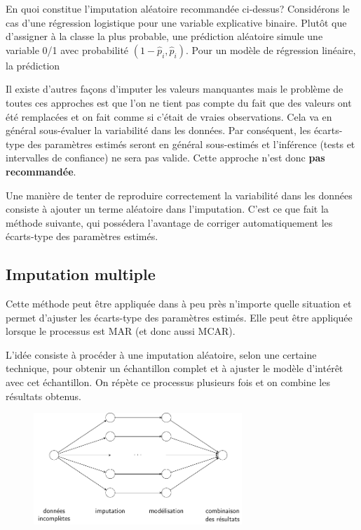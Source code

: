 \documentclass[
  11pt,
  letterpaper,
]{scrbook}
\theoremstyle{definition}
\theoremstyle{remark}
\begin{document}
En quoi constitue l'imputation aléatoire recommandée ci-dessus?
Considérons le cas d'une régression logistique pour une variable
explicative binaire. Plutôt que d'assigner à la classe la plus probable,
une prédiction aléatoire simule une variable 0/1 avec probabilité
\((1-\widehat{p}_i, \widehat{p}_i)\). Pour un modèle de régression
linéaire, la prédiction

Il existe d'autres façons d'imputer les valeurs manquantes mais le
problème de toutes ces approches est que l'on ne tient pas compte du
fait que des valeurs ont été remplacées et on fait comme si c'était de
vraies observations. Cela va en général sous-évaluer la variabilité dans
les données. Par conséquent, les écarts-type des paramètres estimés
seront en général sous-estimés et l'inférence (tests et intervalles de
confiance) ne sera pas valide. Cette approche n'est donc \textbf{pas
recommandée}.

Une manière de tenter de reproduire correctement la variabilité dans les
données consiste à ajouter un terme aléatoire dans l'imputation. C'est
ce que fait la méthode suivante, qui possédera l'avantage de corriger
automatiquement les écarts-type des paramètres estimés.

\hypertarget{imputation-multiple}{%
\subsection{Imputation multiple}\label{imputation-multiple}}

Cette méthode peut être appliquée dans à peu près n'importe quelle
situation et permet d'ajuster les écarts-type des paramètres estimés.
Elle peut être appliquée lorsque le processus est MAR (et donc aussi
MCAR).

L'idée consiste à procéder à une imputation aléatoire, selon une
certaine technique, pour obtenir un échantillon complet et à ajuster le
modèle d'intérêt avec cet échantillon. On répète ce processus plusieurs
fois et on combine les résultats obtenus.

\begin{figure}[ht!]

{\centering \includegraphics[width=0.7\textwidth,height=\textheight]{./figures/donnees_manquantes_workflow.pdf}

}

\end{figure}
\end{document}

